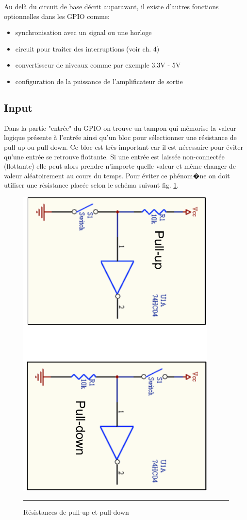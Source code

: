 Au delà du circuit de base décrit auparavant, il existe d'autres fonctions optionnelles dans les GPIO comme:
\begin{itemize}[label=\textbullet,font=\small]
\item synchronisation avec un signal ou une horloge 
\item circuit pour traiter des interruptions (voir ch. 4)
\item convertisseur de niveaux comme par exemple 3.3V - 5V
\item configuration de la puissance de l'amplificateur de sortie
\end{itemize}

\subsection{Input}

Dans la partie "entrée" du GPIO on trouve un tampon qui mémorise la valeur logique présente à l'entrée ainsi qu'un bloc pour sélectionner une résistance de pull-up ou pull-down. Ce bloc est très important car il est nécessaire pour éviter qu'une entrée se retrouve flottante. Si une entrée est laissée non-connectée (flottante) elle peut alors prendre n'importe quelle valeur et même changer de valeur aléatoirement au cours du temps. Pour éviter ce phénom�ne on doit utiliser une résistance placée selon le schéma suivant fig. \ref{fig:pullres}.

\begin{figure}[htb]
  \centering
  \includegraphics[angle=90, width=10cm]{./Figures/gpio/pullres.pdf}
  \rule{35em}{0.5pt}
  \caption[res pull]{Résistances de pull-up et pull-down}
  \label{fig:pullres}
\end{figure}

